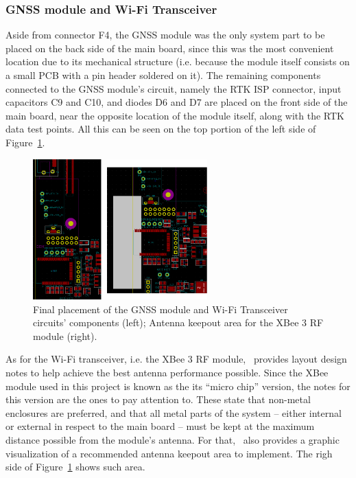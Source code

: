 \subsubsection{GNSS module and Wi-Fi Transceiver}\label{sec:5117_ZED_XBEE}

Aside from connector F4, the GNSS module was the only system part to be placed on the back side of the main board, since this was the most convenient location due to its mechanical structure (i.e. because the module itself consists on a small PCB with a pin header soldered on it). The remaining components connected to the GNSS module's circuit, namely the RTK ISP connector, input capacitors C9 and C10, and diodes D6 and D7 are placed on the front side of the main board, near the opposite location of the module itself, along with the RTK data test points. All this can be seen on the top portion of the left side of Figure~\ref{fig:placement_ZED_XBEE}.

\begin{figure}[h]
	\centering
	\includegraphics[width=0.6\textwidth]{Chapters/Figures/chapter5/placement_ZED_XBEE.png}
	\caption{Final placement of the GNSS module and Wi-Fi Transceiver circuits' components (left); Antenna keepout area for the XBee 3 RF module (right).}
	\label{fig:placement_ZED_XBEE}
\end{figure}%

As for the Wi-Fi transceiver, i.e. the XBee 3 RF module,~\cite{XBee} provides layout design notes to help achieve the best antenna performance possible. Since the XBee module used in this project is known as the its ``micro chip'' version, the notes for this version are the ones to pay attention to. These state that non-metal enclosures are preferred, and that all metal parts of the system -- either internal or external in respect to the main board -- must be kept at the maximum distance possible from the module's antenna. For that,~\cite{XBee} also provides a graphic visualization of a recommended antenna keepout area to implement. The righ side of Figure~\ref{fig:placement_ZED_XBEE} shows such area.

